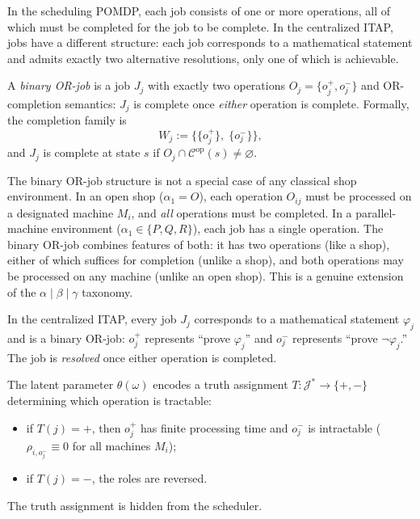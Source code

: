 In the scheduling POMDP, each job consists of one or more operations, all of which
must be completed for the job to be complete. In the centralized ITAP, jobs have a
different structure: each job corresponds to a mathematical statement and admits
exactly two alternative resolutions, only one of which is achievable.

\begin{definition}\label{def:binaryorjob}
A \emph{binary OR-job} is a job $J_j$ with exactly two operations
$O_j = \{o_j^+, o_j^-\}$ and OR-completion semantics: $J_j$ is complete once
\emph{either} operation is complete. Formally, the completion family is
\[
W_j := \bigl\{\{o_j^+\},\; \{o_j^-\}\bigr\},
\]
and $J_j$ is complete at state $s$ if
$O_j \cap \mathcal{C}^{\mathrm{op}}(s) \neq \varnothing$.
\end{definition}

\begin{remark}
The binary OR-job structure is not a special case of any classical shop environment.
In an open shop ($\alpha_1 = O$), each operation $O_{ij}$ must be processed on a
designated machine $M_i$, and \emph{all} operations must be completed. In a
parallel-machine environment ($\alpha_1 \in \{P, Q, R\}$), each job has a single
operation. The binary OR-job combines features of both: it has two operations (like a
shop), either of which suffices for completion (unlike a shop), and both operations
may be processed on any machine (unlike an open shop). This is a genuine extension
of the $\alpha \mid \beta \mid \gamma$ taxonomy.
\end{remark}

In the centralized ITAP, every job $J_j$ corresponds to a mathematical statement
$\varphi_j$ and is a binary OR-job: $o_j^+$ represents ``prove $\varphi_j$'' and
$o_j^-$ represents ``prove $\neg\varphi_j$.'' The job is \emph{resolved} once either
operation is completed.

The latent parameter $\theta(\omega)$ encodes a truth assignment
$T : \mathcal{J}^* \to \{+, -\}$ determining which operation is tractable:
\begin{itemize}
    \item if $T(j) = +$, then $o_j^+$ has finite processing time and $o_j^-$ is
    intractable ($\rho_{i,o_j^-} \equiv 0$ for all machines $M_i$);
    \item if $T(j) = -$, the roles are reversed.
\end{itemize}
The truth assignment is hidden from the scheduler.

